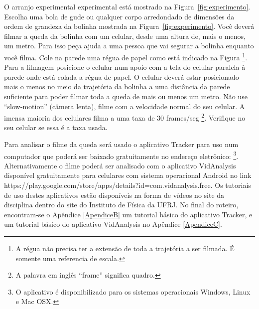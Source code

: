 \begin{minipage}[c]{11.5cm}

\hskip 0.5cm
O arranjo experimental experimental está mostrado na Figura~\ref{fig:experimento}. Escolha uma bola de gude ou qualquer corpo arredondado de dimensões da ordem de grandeza da bolinha mostrada na Figura~\ref{fig:experimento}. Você deverá filmar a queda da bolinha com um celular, desde uma altura de, mais o menos, um metro. Para isso peça ajuda a uma pessoa que vai segurar a bolinha enquanto você filma.  Cole na parede uma régua de papel como está indicado na Figura \footnote{A régua não precisa ter a extensão de toda a trajetória a ser filmada. É somente uma referencia de escala.}. Para a filmagem posicione o celular num apoio com a tela do celular paralela à parede onde está colada a régua de papel. O celular deverá estar posicionado mais o menos no meio da trajetória da bolinha a uma distância da parede suficiente para poder filmar toda a queda de mais ou menos um metro. Não use ``slow-motion'' (câmera lenta),  filme com a velocidade normal do seu celular. A imensa maioria dos celulares filma a uma taxa de 30 frames/seg \footnote{A palavra em inglês ``frame'' significa quadro.}. Verifique no seu celular se essa é a taxa usada.
\par
\hskip 0.5cm
Para analisar o filme da queda será usado o aplicativo Tracker para uso num computador 
que poderá ser baixado gratuitamente no endereço eletrônico:  \footnote {O aplicativo é disponibilizado para os sistemas operacionais Windows, Linux e Mac OSX.}. Alternativamente o filme poderá ser analisado com o aplicativo VidAnalysis disponível gratuitamente para celulares com sistema operacional Android no link  {\color{blue} https://play.google.com/store/apps/details?id=com.vidanalysis.free}. 
Os tutoriais de uso destes aplicativos estão disponíveis na forma de vídeos no site da disciplina dentro do site do Instituto de Física da UFRJ. No final do roteiro, encontram-se o Apêndice \ref{ApendiceB} um tutorial básico do aplicativo Tracker, e um tutorial básico do aplicativo VidAnalysis no Apêndice \ref{ApendiceC}.  
\end{minipage}
\hskip 0.2cm
